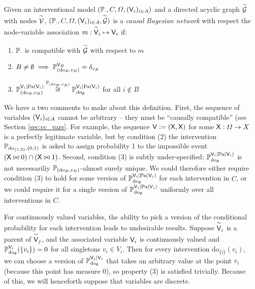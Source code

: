 \begin{definition}\label{def:CBN}
Given an interventional model $(\mathbb{P}_\cdot,C,\Omega,(\mathsf{V}_i)_{i\in A})$ and a directed acyclic graph $\overset{\sim}{\mathcal{G}}$ with nodes $\overset{\sim}{\mathcal{V}}$, $(\mathbb{P}_\cdot,C,\Omega,(\mathsf{V}_i)_{i\in A},\overset{\sim}{\mathcal{G}})$  is a \emph{causal Bayesian network} with respect the node-variable association $m:\overset{\sim}{\mathsf{V}}_i\mapsto \mathsf{V}_i$ if:
\begin{enumerate}
    \item $\mathbb{P}_\cdot$ is compatible with $\overset{\sim}{\mathcal{G}}$ with respect to $m$
    \item $B\neq \emptyset \implies \mathbb{P}_{(\mathrm{do}_{B},v_B)}^{\mathsf{V}_B} = \delta_{v_B}$
    \item $\mathbb{P}_{(\mathrm{do}_{B},v_B)}^{\mathsf{V}_i|\mathrm{Pa}(\mathsf{V}_i)}\overset{\mathbb{P}_{(\mathrm{do}_{B},v_B)}}{\cong}\mathbb{P}_{\mathrm{do}_{\emptyset}}^{\mathsf{V}_i|\mathrm{Pa}(\mathsf{V}_i)}$ for all $i\not\in B$
\end{enumerate}
\end{definition}

We have a two comments to make about this definition. First, the sequence of variables $(\mathsf{V}_i)_{i\in A}$ cannot be arbitrary -- they must be ``causally compatible'' (see Section \ref{sec:cc_vars}. For example, the sequence $\mathsf{V}:=(\mathsf{X},\mathsf{X})$ for some $\mathsf{X}:\Omega\to X$ is a perfectly legitimate variable, but by condition (2) the intervention $\mathbb{P}_{\mathrm{do}_{\{1,2\}},(0,1)}$ is asked to assign probability 1 to the impossible event $(\mathsf{X}\bowtie 0)\cap (\mathsf{X}\bowtie 1)$. Second, condition (3) is subtly under-specified: $\mathbb{P}_{\mathrm{do}_{\emptyset}}^{\mathsf{V}_i|\mathrm{Pa}(\mathsf{V}_i)}$ is not necessariliy $\mathbb{P}_{(\mathrm{do}_{B},v_B)}$-almost surely unique. We could therefore either require condition (3) to hold for some version of $\mathbb{P}_{\mathrm{do}_{\emptyset}}^{\mathsf{V}_i|\mathrm{Pa}(\mathsf{V}_i)}$ for each intervention in $C$, or we could require it for a single version of $\mathbb{P}_{\mathrm{do}_{\emptyset}}^{\mathsf{V}_i|\mathrm{Pa}(\mathsf{V}_i)}$ uniformly over all interventions in $C$.

For continuously valued variables, the ability to pick a version of the conditional probability for each intervention leads to undesirable results. Suppose $\overset{\sim}{\mathsf{V}}_i$ is a parent of $\overset{\sim}{\mathsf{V}}_j$, and the associated variable $\mathsf{V}_i$ is continuously valued and $\mathbb{P}_{\mathrm{do}_{\emptyset}}^{\mathsf{V}_i}(\{v_i\})=0$ for all singletons $v_i\in V_i$. Then for every intervention $\mathrm{do}_{\{i\}}(v_i)$, we can choose a version of $\mathbb{P}_{\mathrm{do}_{\emptyset}}^{\mathsf{V}_j|\mathsf{V}_i}$ that takes an arbitrary value at the point $v_i$ (because this point has measure 0), so property (3) is satisfied trivially. Because of this, we will henceforth suppose that variables are discrete.

